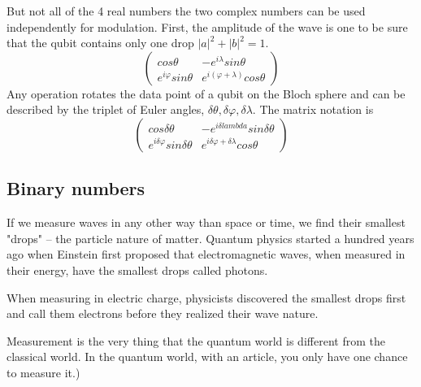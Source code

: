 \documentclass{book}
\begin{document}
But not all of the 4 real numbers the two complex numbers can be used independently for modulation. First, the amplitude of the wave is one to be sure that the qubit contains only one drop $|a|^2 + |b|^2 = 1$.
\begin{equation}
    \begin{pmatrix}
    cos\theta & -e^{i\lambda} sin\theta \\
    e^{i\varphi} sin\theta & e^{i(\varphi + \lambda)} cos\theta
\end{pmatrix}
\end{equation}
Any operation rotates the data point of a qubit on the Bloch sphere and can be described by the triplet of Euler angles, $\delta \theta, \delta \varphi, \delta \lambda$. The matrix notation is
\begin{equation}
    \begin{pmatrix}
        cos\delta \theta & -e^{i\delta lambda} sin\delta \theta \\
        e^{i \delta \varphi} sin\delta \theta & e^{i \delta \varphi+ \delta \lambda} cos\theta 
    \end{pmatrix}
\end{equation}

\subsection{Binary numbers}

If we measure waves in any other way than space or time, we find their smallest "drops" -- the particle nature of matter. Quantum physics started a hundred years ago when Einstein first proposed that electromagnetic waves, when measured in their energy, have the smallest drops called photons.

When measuring in electric charge, physicists discovered the smallest drops first and call them electrons before they realized their wave nature.

Measurement is the very thing that the quantum world is different from the classical world. In the quantum world, with an article, you only have one chance to measure it.)
\end{document}
